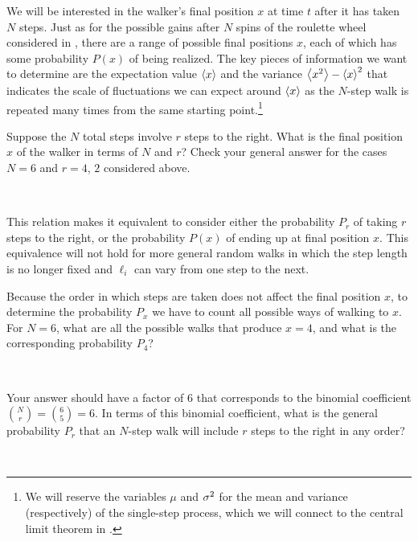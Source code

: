 We will be interested in the walker's final position $x$ at time $t$ after it has taken $N$ steps.
Just as for the possible gains after $N$ spins of the roulette wheel considered in , there are a range of possible final positions $x$, each of which has some probability $P(x)$ of being realized.
The key pieces of information we want to determine are the expectation value $\left\langle x \right\rangle$ and the variance $\left\langle x^2 \right\rangle - \left\langle x \right\rangle^2$ that indicates the scale of fluctuations we can expect around $\left\langle x \right\rangle$ as the $N$-step walk is repeated many times from the same starting point.\footnote{We will reserve the variables $\mu$ and $\sigma^2$ for the mean and variance (respectively) of the single-step process, which we will connect to the central limit theorem in .}

Suppose the $N$ total steps involve $r$ steps to the right.
What is the final position $x$ of the walker in terms of $N$ and $r$?
Check your general answer for the cases $N = 6$ and $r = 4$, $2$ considered above.
\begin{mdframed}
  \ \\[100 pt]
\end{mdframed}
This relation makes it equivalent to consider either the probability $P_r$ of taking $r$ steps to the right, or the probability $P(x)$ of ending up at final position $x$.
This equivalence will not hold for more general random walks in which the step length is no longer fixed and $\ell_i$ can vary from one step to the next.

\newpage %
Because the order in which steps are taken does not affect the final position $x$, to determine the probability $P_x$ we have to count all possible ways of walking to $x$.
For $N = 6$, what are all the possible walks that produce $x = 4$, and what is the corresponding probability $P_4$?
\begin{mdframed}
  \ \\[100 pt]
\end{mdframed}
Your answer should have a factor of $6$ that corresponds to the binomial coefficient $\binom{N}{r} = \binom{6}{5} = 6$.
In terms of this binomial coefficient, what is the general probability $P_r$ that an $N$-step walk will include $r$ steps to the right in any order?
\begin{mdframed}
  \ \\[100 pt]
\end{mdframed}

